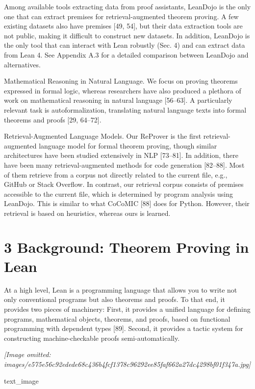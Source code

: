 \documentclass[
]{article}
\begin{document}
Among available tools extracting data from proof assistants, LeanDojo is
the only one that can extract premises for retrieval-augmented theorem
proving. A few existing datasets also have premises {[}49, 54{]}, but
their data extraction tools are not public, making it difficult to
construct new datasets. In addition, LeanDojo is the only tool that can
interact with Lean robustly (Sec. 4) and can extract data from Lean 4.
See Appendix A.3 for a detailed comparison between LeanDojo and
alternatives.

Mathematical Reasoning in Natural Language. We focus on proving theorems
expressed in formal logic, whereas researchers have also produced a
plethora of work on mathematical reasoning in natural language
{[}56--63{]}. A particularly relevant task is autoformalization,
translating natural language texts into formal theorems and proofs
{[}29, 64--72{]}.

Retrieval-Augmented Language Models. Our ReProver is the first
retrieval-augmented language model for formal theorem proving, though
similar architectures have been studied extensively in NLP {[}73--81{]}.
In addition, there have been many retrieval-augmented methods for code
generation {[}82--88{]}. Most of them retrieve from a corpus not
directly related to the current file, e.g., GitHub or Stack Overflow. In
contrast, our retrieval corpus consists of premises accessible to the
current file, which is determined by program analysis using LeanDojo.
This is similar to what CoCoMIC {[}88{]} does for Python. However, their
retrieval is based on heuristics, whereas ours is learned.

\section{3 Background: Theorem Proving in
Lean}\label{background-theorem-proving-in-lean}

At a high level, Lean is a programming language that allows you to write
not only conventional programs but also theorems and proofs. To that
end, it provides two pieces of machinery: First, it provides a unified
language for defining programs, mathematical objects, theorems, and
proofs, based on functional programming with dependent types {[}89{]}.
Second, it provides a tactic system for constructing machine-checkable
proofs semi-automatically.

\textit{[Image omitted: images/e575e56c92edede68c436b4fcf1378c96292ee85faf662a27dc4298bf01f347a.jpg]}

text\_image
\end{document}
